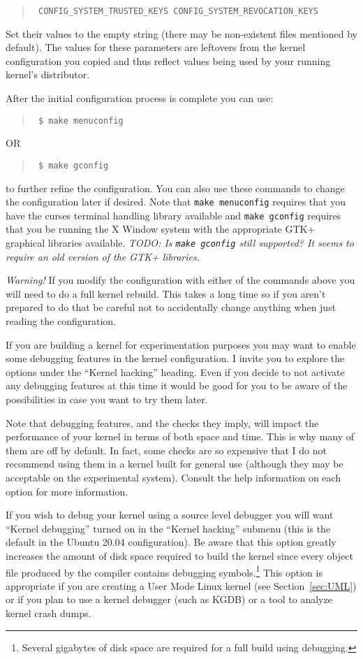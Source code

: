 \documentclass{article}
\newcommand{\command}[1]{\texttt{#1}}
\newcommand{\todo}[1]{\textit{TODO: #1}}
\newenvironment{commands}
  {\begin{quote} \tt}
  {\end{quote}}
\begin{document}
\begin{commands}
  CONFIG\_SYSTEM\_TRUSTED\_KEYS
  CONFIG\_SYSTEM\_REVOCATION\_KEYS
\end{commands}

Set their values to the empty string (there may be non-existent files mentioned by default). The
values for these parameters are leftovers from the kernel configuration you copied and thus
reflect values being used by your running kernel's distributor.

After the initial configuration process is complete you can use:
\begin{commands}
\$ make menuconfig
\end{commands}
OR
\begin{commands}
\$ make gconfig
\end{commands}

to further refine the configuration. You can also use these commands to change the configuration
later if desired. Note that \command{make menuconfig} requires that you have the curses terminal
handling library available and \command{make gconfig} requires that you be running the X Window
system with the appropriate GTK+ graphical libraries available. \todo{Is \texttt{make gconfig}
  still supported? It seems to require an old version of the GTK+ libraries.}

\textit{Warning!} If you modify the configuration with either of the commands above you will
need to do a full kernel rebuild. This takes a long time so if you aren't prepared to do that be
careful not to accidentally change anything when just reading the configuration.

If you are building a kernel for experimentation purposes you may want to enable some debugging
features in the kernel configuration. I invite you to explore the options under the ``Kernel
hacking'' heading. Even if you decide to not activate any debugging features at this time it
would be good for you to be aware of the possibilities in case you want to try them later.

Note that debugging features, and the checks they imply, will impact the performance of your
kernel in terms of both space and time. This is why many of them are off by default. In fact,
some checks are so expensive that I do not recommend using them in a kernel built for general
use (although they may be acceptable on the experimental system). Consult the help information
on each option for more information.

If you wish to debug your kernel using a source level debugger you will want ``Kernel debugging''
turned on in the ``Kernel hacking'' submenu (this is the default in the Ubuntu 20.04
configuration). Be aware that this option greatly increases the amount of disk space required to
build the kernel since every object file produced by the compiler contains debugging
symbols.\footnote{Several gigabytes of disk space are required for a full build using
  debugging.} This option is appropriate if you are creating a User Mode Linux kernel (see
Section~\ref{sec:UML}) or if you plan to use a kernel debugger (such as KGDB) or a tool to
analyze kernel crash dumps.
\end{document}
